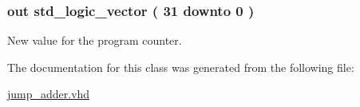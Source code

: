 \hypertarget{classjump__adder_ad176de343f2a06617f92deabbbbf6256}{
\subsubsection[{jmp\-\_\-adress}]{ {\bfseries out } {\bfseries std\-\_\-logic\-\_\-vector (   31    downto    0  ) } }}\label{classjump__adder_ad176de343f2a06617f92deabbbbf6256}


\-New value for the program counter. 



\-The documentation for this class was generated from the following file\-:\begin{DoxyCompactItemize}
\item 
\hyperlink{jump__adder_8vhd}{jump\-\_\-adder.\-vhd}\end{DoxyCompactItemize}
